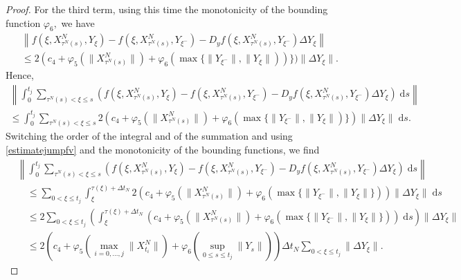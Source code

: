 \documentclass[reqno,12pt]{amsart}
\theoremstyle{plain} %
\theoremstyle{definition} %
\begin{document}
\begin{proof}
    For the third term, using this time the monotonicity of the bounding function $\varphi_6,$ we have
    \begin{multline*}
        \left\|f(\xi, X_{\tau^N(s)}^N, Y_\xi) - f(\xi, X_{\tau^N(s)}^N, Y_{\xi^{-}}) - D_y f(\xi, X_{\tau^N(s)}^N, Y_{\xi^-})\Delta Y_\xi\right\| \\
        \leq 2(c_4 + \varphi_5(\|X_{\tau^N(s)}^N\|) + \varphi_6(\max\{\|Y_{\xi^{-}}\|, \|Y_{\xi}\|))\})\|\Delta Y_\xi\|.
    \end{multline*}
    Hence,
    \begin{multline*}
        \left\|\int_0^{t_j} \sum_{\tau^N(s) < \xi \leq s} \left(f(\xi, X_{\tau^N(s)}^N, Y_\xi) - f(\xi, X_{\tau^N(s)}^N, Y_{\xi^{-}}) - D_y f(\xi, X_{\tau^N(s)}^N, Y_{\xi^-})\Delta Y_\xi\right)\;\mathrm{d}s\right\| \\
        \leq \int_0^{t_j} \sum_{\tau^N(s) < \xi \leq s} 2(c_4 + \varphi_5(\|X_{\tau^N(s)}^N\|) + \varphi_6(\max\{\|Y_{\xi^{-}}\|, \|Y_{\xi}\|)\})\|\Delta Y_\xi\|\;\mathrm{d}s.
    \end{multline*}
    Switching the order of the integral and of the summation and using \eqref{estimatejumpfv} and the monotonicity of the bounding functions, we find
    \begin{equation}
        \label{ordercadlagfvterm3}
        \begin{aligned}
            & \left\|\int_0^{t_j} \sum_{\tau^N(s) < \xi \leq s} \left(f(\xi, X_{\tau^N(s)}^N, Y_\xi) - f(\xi, X_{\tau^N(s)}^N, Y_{\xi^{-}}) - D_y f(\xi, X_{\tau^N(s)}^N, Y_{\xi^-})\Delta Y_\xi\right)\;\mathrm{d}s\right\| \\
            & \quad \leq \sum_{0 < \xi \leq t_j} \int_{\xi}^{\tau(\xi)+\Delta t_N} 2\left(c_4 + \varphi_5(\|X_{\tau^N(s)}^N\|) + \varphi_6\left(\max\{\|Y_{\xi^{-}}\|, \|Y_{\xi}\|\}\right)\right)\|\Delta Y_\xi\|\;\mathrm{d}s \\
            & \quad \leq 2 \sum_{0 < \xi \leq t_j} \left(\int_{\xi}^{\tau(\xi)+\Delta t_N} \left(c_4 + \varphi_5(\|X_{\tau^N(s)}^N\|) + \varphi_6\left(\max\{\|Y_{\xi^{-}}\|, \|Y_{\xi}\|\}\right)\right)\;\mathrm{d}s \right)\|\Delta Y_\xi\| \\
            & \quad \leq 2\left(c_4 + \varphi_5\left(\max_{i=0, \ldots, j}\|X_{t_i}^N\|\right) + \varphi_6\left(\sup_{0\leq s \leq t_j}\|Y_s\|\right)\right) \Delta t_N\sum_{0 < \xi \leq t_j} \|\Delta Y_\xi\|.
        \end{aligned}
    \end{equation}
    

\end{proof}
\end{document}
